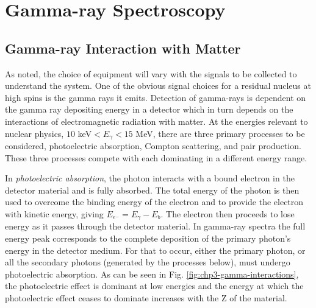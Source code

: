 \section{Gamma-ray Spectroscopy}
\label{sec:exp-pr-gamma-spec}
\subsection{Gamma-ray Interaction with Matter}
\label{ssec:exp-pr-gamma-spec-interactions}
As noted, the choice of equipment will vary with the signals to be collected to understand the system. One of the obvious signal choices for a residual nucleus at high spins is the gamma rays it emits. Detection of gamma-rays is dependent on the gamma ray depositing energy in a detector which in turn depends on the interactions of electromagnetic radiation with matter. At the energies relevant to nuclear physics, $10$ keV$<E_{\gamma}<15$ MeV, there are three primary processes to be considered, photoelectric absorption, Compton scattering, and pair production. These three processes compete with each dominating in a different energy range.

In \emph{photoelectric absorption}, the photon interacts with a bound electron in the detector material and is fully absorbed\cite{einstein-PE}. The total energy of the photon is then used to overcome the binding energy of the electron and to provide the electron with kinetic energy, giving $E_{e^-}=E_{\gamma}-E_b$. The electron then proceeds to lose energy as it passes through the detector material. In gamma-ray spectra the full energy peak corresponds to the complete deposition of the primary photon's energy in the detector medium. For that to occur, either the primary photon, or all the secondary photons (generated by the processes below), must undergo photoelectric absorption. As can be seen in Fig. \ref{fig:chp3-gamma-interactions}, the photoelectric effect is dominant at low energies and the energy at which the photoelectric effect ceases to dominate increases with the Z of the material.

